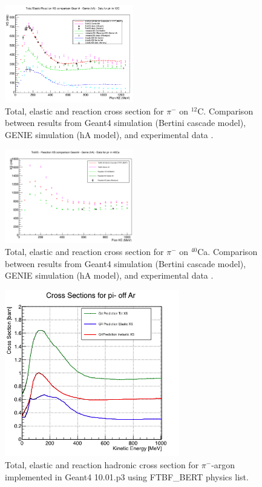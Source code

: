 \begin{figure}
\centering
	   \includegraphics[width=0.5\textwidth]{Chapter-1/Images/IreneCarbon.png}
	   	        \caption{ Total, elastic and reaction cross section for $\pi^-$ on $^{12}$C. Comparison between results from Geant4 simulation (Bertini cascade model), GENIE simulation (hA model), and experimental data \cite{Clough1974, PhysRevC.23.2173, ALLARDYCE19731,osti_4488432}.}
        \label{fig:pionC}
\end{figure}

\begin{figure}
\centering
	\includegraphics[width=0.5\textwidth]{Chapter-1/Images/IreneCalcium.png}
        \caption{Total, elastic and reaction cross section for $\pi^-$ on $^{40}$Ca. Comparison between results from Geant4 simulation (Bertini cascade model),  GENIE simulation (hA model), and experimental data \cite{ALLARDYCE19731}.}
        \label{fig:pionCa}
\end{figure}

\begin{figure}[hbpt]
\centering
\includegraphics[width=3in]{Chapter-1/Images/cPionsG4.png}
\caption{Total, elastic and reaction hadronic cross section for $\pi^-$-argon implemented in Geant4  10.01.p3 using FTBF\_BERT physics list.}
\label{fig:PionTrueArgon}
\end{figure}

